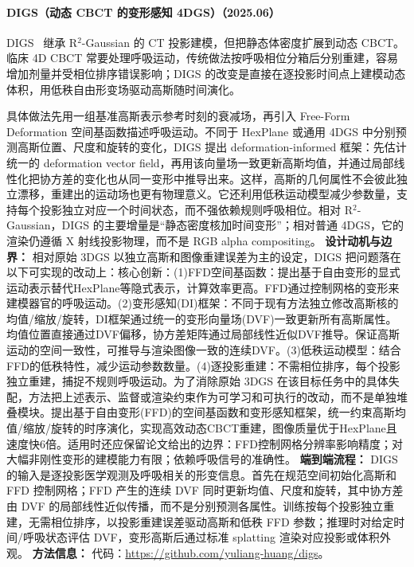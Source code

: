 \paragraph{DIGS（动态 CBCT 的变形感知 4DGS）（2025.06）}
DIGS~\cite{2506_22280} 继承 R$^2$-Gaussian 的 CT 投影建模，但把静态体密度扩展到动态 CBCT。临床 4D CBCT 常要处理呼吸运动，传统做法按呼吸相位分箱后分别重建，容易增加剂量并受相位排序错误影响；DIGS 的改变是直接在逐投影时间点上建模动态体积，用低秩自由形变场驱动高斯随时间演化。

具体做法先用一组基准高斯表示参考时刻的衰减场，再引入 Free-Form Deformation 空间基函数描述呼吸运动。不同于 HexPlane 或通用 4DGS 中分别预测高斯位置、尺度和旋转的变化，DIGS 提出 deformation-informed 框架：先估计统一的 deformation vector field，再用该向量场一致更新高斯均值，并通过局部线性化把协方差的变化也从同一变形中推导出来。这样，高斯的几何属性不会彼此独立漂移，重建出的运动场也更有物理意义。它还利用低秩运动模型减少参数量，支持每个投影独立对应一个时间状态，而不强依赖规则呼吸相位。相对 R$^2$-Gaussian，DIGS 的主要增量是“静态密度核加时间变形”；相对普通 4DGS，它的渲染仍遵循 X 射线投影物理，而不是 RGB alpha compositing。
\textbf{设计动机与边界：} 相对原始 3DGS 以独立高斯和图像重建误差为主的设定，DIGS 把问题落在以下可实现的改动上：核心创新：(1)FFD空间基函数：提出基于自由变形的显式运动表示替代HexPlane等隐式表示，计算效率更高。FFD通过控制网格的变形来建模器官的呼吸运动。(2)变形感知(DI)框架：不同于现有方法独立修改高斯核的均值/缩放/旋转，DI框架通过统一的变形向量场(DVF)一致更新所有高斯属性。均值位置直接通过DVF偏移，协方差矩阵通过局部线性近似DVF推导。保证高斯运动的空间一致性，可推导与渲染图像一致的连续DVF。(3)低秩运动模型：结合FFD的低秩特性，减少运动参数数量。(4)逐投影重建：不需相位排序，每个投影独立重建，捕捉不规则呼吸运动。为了消除原始 3DGS 在该目标任务中的具体失配，方法把上述表示、监督或渲染约束作为可学习和可执行的改动，而不是单独堆叠模块。提出基于自由变形(FFD)的空间基函数和变形感知框架，统一约束高斯均值/缩放/旋转的时序演化，实现高效动态CBCT重建，图像质量优于HexPlane且速度快6倍。适用时还应保留论文给出的边界：FFD控制网格分辨率影响精度；对大幅非刚性变形的建模能力有限；依赖呼吸信号的准确性。
\textbf{端到端流程：} DIGS 的输入是逐投影医学观测及呼吸相关的形变信息。首先在规范空间初始化高斯和 FFD 控制网格；FFD 产生的连续 DVF 同时更新均值、尺度和旋转，其中协方差由 DVF 的局部线性近似传播，而不是分别预测各属性。训练按每个投影独立重建，无需相位排序，以投影重建误差驱动高斯和低秩 FFD 参数；推理时对给定时间/呼吸状态评估 DVF，变形高斯后通过标准 splatting 渲染对应投影或体积外观。
\textbf{方法信息：} 代码：\url{https://github.com/yuliang-huang/digs}。



